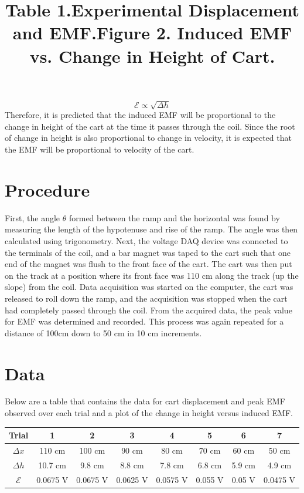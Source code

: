 \documentclass[12pt,letterpaper]{article}
\begin{document}
\begin{equation}
\mathcal{E}\propto\sqrt{\Delta h}
\end{equation} 
Therefore, it is predicted that the induced EMF will be proportional to the change in height of the cart at the time it passes through the coil. Since the root of change in height is also proportional to change in velocity, it is expected that the EMF will be proportional to velocity of the cart.
\pagebreak
\section*{Procedure}
First, the angle $\theta$ formed between the ramp and the horizontal was found by measuring the length of the hypotenuse and rise of the ramp. The angle was then calculated using trigonometry. Next, the voltage DAQ device was connected to the terminals of the coil, and a bar magnet was taped to the cart such that one end of the magnet was flush to the front face of the cart. The cart was then put on the track at a position where its front face was 110 cm along the track (up the slope) from the coil. Data acquisition was started on the computer, the cart was released to roll down the ramp, and the acquisition was stopped when the cart had completely passed through the coil. From the acquired data, the peak value for EMF was determined and recorded. This process was again repeated for a distance of 100cm down to 50 cm in 10 cm increments.
\section*{Data}
Below are a table that contains the data for cart displacement and peak EMF observed over each trial and a plot of the change in height versus induced EMF.\vspace{12pt}\\
\title{\textbf{Table 1.}Experimental Displacement and EMF.}
\begin{center}
\renewcommand{\arraystretch}{1.5}
\begin{tabular}{|c|c|c|c|c|c|c|c|}
\hline 
Trial & 1 & 2 & 3 & 4 & 5 & 6 & 7 \\ 
\hline 
$\Delta x$ & 110 cm & 100 cm & 90 cm & 80 cm & 70 cm & 60 cm & 50 cm \\ 
\hline 
$\Delta h$ & 10.7 cm & 9.8 cm & 8.8 cm & 7.8 cm & 6.8 cm & 5.9 cm & 4.9 cm \\ 
\hline 
$\mathcal{E}$ & 0.0675 V & 0.0675 V & 0.0625 V & 0.0575 V & 0.055 V & 0.05 V& 0.0475 V\\ 
\hline 
\end{tabular} 
\end{center}\vspace{6pt}
\title{\textbf{Figure 2.} Induced EMF vs. Change in Height of Cart.}
\begin{center}
    	\resizebox{0.6\textwidth}{!}{}
\end{center}
\pagebreak
\end{document}
